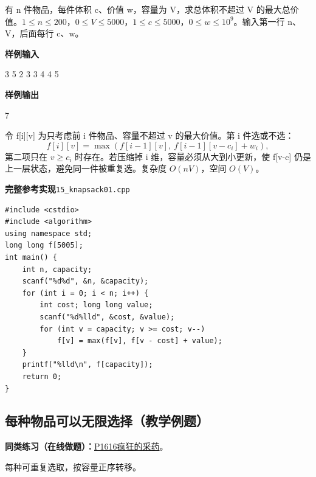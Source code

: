 \documentclass[UTF8,11pt,a4paper,fontset=none]{ctexart}
\newcommand{\practice}[2]{\par\noindent\textbf{同类练习（在线做题）：}\href{https://www.luogu.com.cn/problem/#1}{#1\quad #2}。\par}
\begin{document}
有 n 件物品，每件体积 c、价值 w，容量为 V，求总体积不超过 V 的最大总价值。$1\le n\le200$，$0\le V\le5000$，$1\le c\le5000$，$0\le w\le10^9$。输入第一行 n、V，后面每行 c、w。
\begin{tcolorbox}[samplebox,title={输入输出样例}]
\textbf{样例输入}
\begin{Sample}
3 5
2 3
3 4
4 5
\end{Sample}
\tcblower
\textbf{样例输出}
\begin{Sample}
7
\end{Sample}
\end{tcolorbox}
令 f[i][v] 为只考虑前 i 件物品、容量不超过 v 的最大价值。第 i 件选或不选：
\[f[i][v]=\max(f[i-1][v],\ f[i-1][v-c_i]+w_i),\]
第二项只在 $v\ge c_i$ 时存在。若压缩掉 i 维，容量必须从大到小更新，使 f[v-c] 仍是上一层状态，避免同一件被重复选。复杂度 $O(nV)$，空间 $O(V)$。
\par\noindent\begin{minipage}{\linewidth}
\textbf{完整参考实现}\quad\texttt{15\_knapsack01.cpp}
\begin{lstlisting}
#include <cstdio>
#include <algorithm>
using namespace std;
long long f[5005];
int main() {
    int n, capacity;
    scanf("%d%d", &n, &capacity);
    for (int i = 0; i < n; i++) {
        int cost; long long value;
        scanf("%d%lld", &cost, &value);
        for (int v = capacity; v >= cost; v--)
            f[v] = max(f[v], f[v - cost] + value);
    }
    printf("%lld\n", f[capacity]);
    return 0;
}
\end{lstlisting}
\end{minipage}\par

\subsection{每种物品可以无限选择（教学例题）}

\practice{P1616}{疯狂的采药}
每种可重复选取，按容量正序转移。
\end{document}
